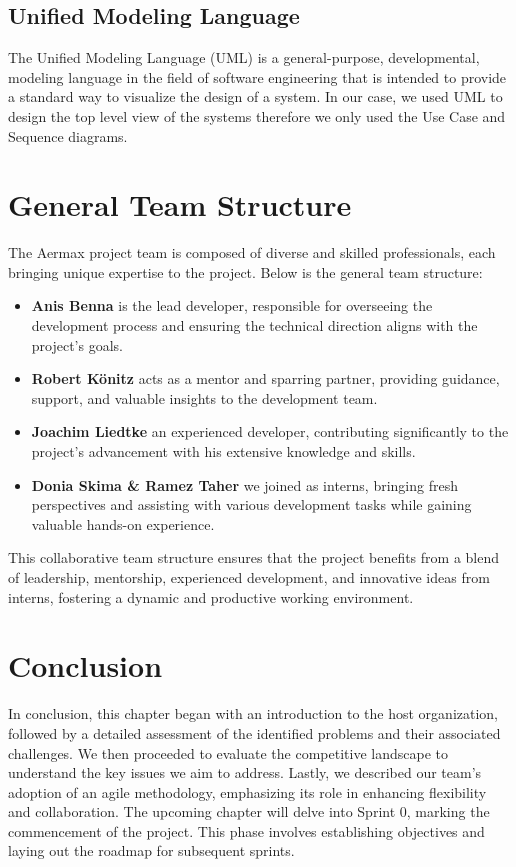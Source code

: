 \subsection{Unified Modeling Language}
The Unified Modeling Language (UML) is a general-purpose, developmental, modeling language in the field of software engineering that is intended to provide a standard way to visualize the design of a system. In our case, we used UML to design the top level view of the systems therefore we only used the Use Case and Sequence diagrams.

\section{General Team Structure}
The Aermax project team is composed of diverse and skilled professionals, each bringing unique expertise to the project. Below is the general team structure:

\begin{itemize}
    \item \textbf{Anis Benna} is the lead developer, responsible for overseeing the development process and ensuring the technical direction aligns with the project's goals.
    \item \textbf{Robert Könitz} acts as a mentor and sparring partner, providing guidance, support, and valuable insights to the development team.
    \item \textbf{Joachim Liedtke} an experienced developer, contributing significantly to the project's advancement with his extensive knowledge and skills.
    \item \textbf{Donia Skima \& Ramez Taher} we joined as interns, bringing fresh perspectives and assisting with various development tasks while gaining valuable hands-on experience.
\end{itemize}

This collaborative team structure ensures that the project benefits from a blend of leadership, mentorship, experienced development, and innovative ideas from interns, fostering a dynamic and productive working environment.


\setcounter{secnumdepth}{0} %
\section{Conclusion}
In conclusion, this chapter began with an introduction to the host organization, followed by a detailed assessment of the identified problems and their associated challenges. We then proceeded to evaluate the competitive landscape to understand the key issues we aim to address. Lastly, we described our team’s adoption of an agile methodology, emphasizing its role in enhancing flexibility and collaboration. The upcoming chapter will delve into Sprint 0, marking the commencement of the project. This phase involves establishing objectives and laying out the roadmap for subsequent sprints.
